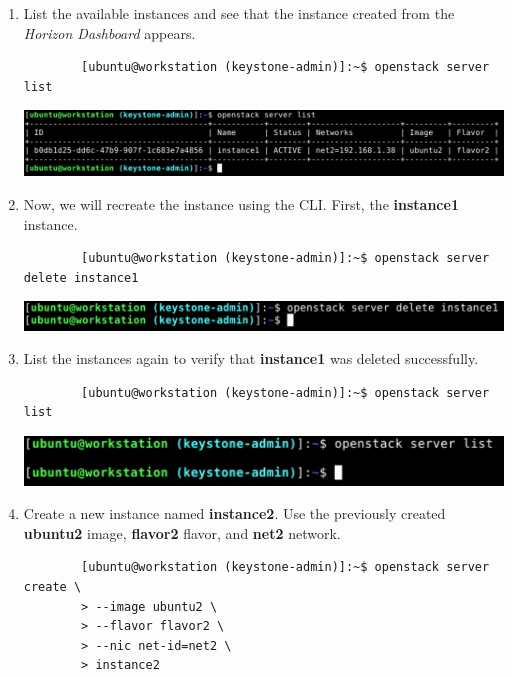 \documentclass[letterpaper, 12pt]{article}
\begin{document}
\begin{enumerate}
    \item List the available instances and see that the instance created from the \textit{Horizon Dashboard} appears.
    \begin{lstlisting}
        [ubuntu@workstation (keystone-admin)]:~$ openstack server list
    \end{lstlisting}

    \begin{center}
        \includegraphics[width=\linewidth]{images/part4/step9.png}
    \end{center}

    \item Now, we will recreate the instance using the CLI.
    First, the \textbf{instance1} instance.
    \begin{lstlisting}
        [ubuntu@workstation (keystone-admin)]:~$ openstack server delete instance1
    \end{lstlisting}

    \begin{center}
        \includegraphics[width=\linewidth]{images/part4/step10.png}
    \end{center}

    \item List the instances again to verify that \textbf{instance1} was deleted successfully.
    \begin{lstlisting}
        [ubuntu@workstation (keystone-admin)]:~$ openstack server list
    \end{lstlisting}

    \begin{center}
        \includegraphics[width=\linewidth]{images/part4/step11.png}
    \end{center}

    \item Create a new instance named \textbf{instance2}.
    Use the previously created \textbf{ubuntu2} image, \textbf{flavor2} flavor, and \textbf{net2} network.
    \begin{lstlisting}
        [ubuntu@workstation (keystone-admin)]:~$ openstack server create \
        > --image ubuntu2 \
        > --flavor flavor2 \
        > --nic net-id=net2 \
        > instance2
    \end{lstlisting}


\end{enumerate}
\end{document}
